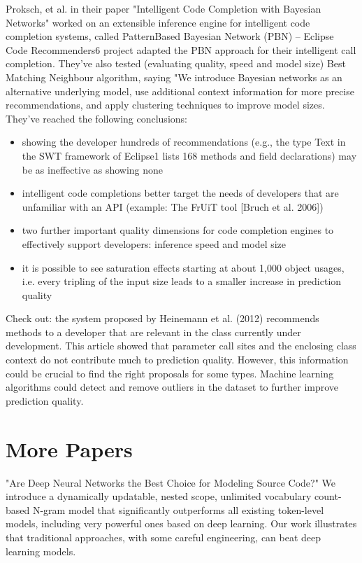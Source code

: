 Proksch, et al. in their paper "Intelligent Code Completion with Bayesian Networks" worked on
an extensible inference engine for intelligent code completion systems, called PatternBased 
Bayesian Network (PBN) -- Eclipse Code Recommenders6 project adapted the PBN approach for their
intelligent call completion. They've also tested (evaluating quality, speed and model size)
Best Matching Neighbour algorithm, saying "We introduce Bayesian networks as an alternative
underlying model, use additional context information for more precise recommendations, and
apply clustering techniques to improve model sizes.
They've reached the following conclusions:
\begin{itemize}
    \item showing the developer hundreds of recommendations (e.g., the type Text in the SWT framework of Eclipse1 lists 168 methods and field declarations) may be as ineffective as showing none
    \item intelligent code completions better target the needs of developers that are unfamiliar with an API (example: The FrUiT tool [Bruch et al. 2006])
    \item two further important quality dimensions for code completion engines to effectively support developers: inference speed and model size
    \item it is possible to see saturation effects starting at about 1,000 object usages, i.e. every tripling of the input size leads to a smaller increase in prediction quality
\end{itemize}
Check out: the system proposed by Heinemann et al. (2012) recommends methods to a developer that are relevant in the class currently under development.
This article showed that parameter call sites and the enclosing class context do not contribute
much to prediction quality. However, this information could be crucial to find the right proposals
for some types. Machine learning algorithms could detect and remove outliers in the dataset
to further improve prediction quality.

\section{More Papers}
"Are Deep Neural Networks the Best Choice for Modeling Source Code?"
We introduce a dynamically updatable, nested scope, unlimited vocabulary count-based
N-gram model that significantly outperforms all existing token-level models, including
very powerful ones based on deep learning. Our work illustrates that traditional
approaches, with some careful engineering, can beat deep learning models.

